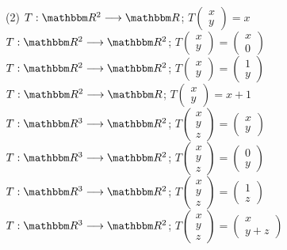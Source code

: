 \begin{tasks}[
    style=enumerate,
    label-offset = 3mm,
    ](2)
    \task $T: \RR[2] \longrightarrow \RR$; $T\begin{pmatrix*}x \\ y\end{pmatrix*}=x$
    \task $T: \RR[2] \longrightarrow \RR[2]$; $T\begin{pmatrix*}x \\ y\end{pmatrix*}=\begin{pmatrix*}x \\ 0\end{pmatrix*}$
    \task $T: \RR[2] \longrightarrow \RR[2]$; $T\begin{pmatrix*}x \\ y\end{pmatrix*}=\begin{pmatrix*}1 \\ y\end{pmatrix*}$
    \task $T: \RR[2] \longrightarrow \RR$; $T\begin{pmatrix*}x \\ y\end{pmatrix*}=x+1$
    \task $T: \RR[3] \longrightarrow \RR[2]$; $T\begin{pmatrix*}x \\ y \\ z\end{pmatrix*}=\begin{pmatrix*}x \\ y\end{pmatrix*}$
    \task $T: \RR[3] \longrightarrow \RR[2]$; $T\begin{pmatrix*}x \\ y \\ z\end{pmatrix*}=\begin{pmatrix*}0 \\ y\end{pmatrix*}$
    \task $T: \RR[3] \longrightarrow \RR[2]$; $T\begin{pmatrix*}x \\ y \\ z\end{pmatrix*}=\begin{pmatrix*}1 \\ z\end{pmatrix*}$
    \task $T: \RR[3] \longrightarrow \RR[2]$; $T\begin{pmatrix*}x \\ y \\ z\end{pmatrix*}=\begin{pmatrix*}x \\ y+z\end{pmatrix*}$

\end{tasks}
